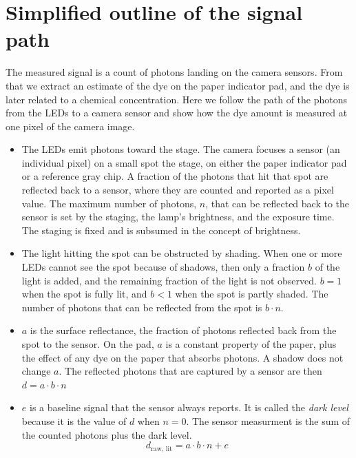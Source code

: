 \documentclass[11pt,letter]{article}
\begin{document}
\section{Simplified outline of the signal path}
\label{sec:thought}

The measured signal is a count of photons landing on the camera sensors.  
From that we extract an estimate of the dye on the paper indicator pad, 
and the dye is later related to a chemical concentration. 
Here we follow the path of the photons from the LEDs to a camera sensor and show how the dye amount is measured at one pixel of the camera image.
\begin{itemize}[nosep]
  \item The LEDs emit photons toward the stage. %
    The camera focuses a sensor (an individual pixel) on a small spot the stage, on either the paper indicator pad or a reference gray chip. 
    A fraction of the photons that hit that spot are reflected back to a sensor, where they are counted and reported as a pixel value.
    The maximum number of photons, $n$, that can be reflected back to the sensor is set by the staging, the lamp's brightness, and the exposure time.  
    The staging is fixed and is subsumed in the concept of brightness.
  \item The light hitting the spot can be obstructed by shading.
    When one or more LEDs cannot see the spot because of shadows, then only a fraction $b$ of the light is added, and the remaining fraction of the light is not observed.
   	$b = 1$ when the spot is fully lit, and $b < 1$ when the spot is partly shaded.
   	The number of photons that can be reflected from the spot is $b \cdot n$.
  \item $a$ is the surface reflectance, the fraction of photons reflected back from the spot to the sensor.  
    On the pad, $a$ is a constant property of the paper, plus the effect of any dye on the paper that absorbs photons. 
    A shadow does not change $a$.
    The reflected photons that are captured by a sensor are then $d = a \cdot b \cdot n$
  \item $e$ is a baseline signal that the sensor always reports. 
    It is called the \textit{dark level} because it is the value of $d$ when $n=0$.
    The sensor measurment is the sum of the counted photons plus the dark level.
    \begin{equation}
    	d_\text{raw, lit} = a \cdot b \cdot n + e
    \end{equation}
\end{itemize}
\end{document}
